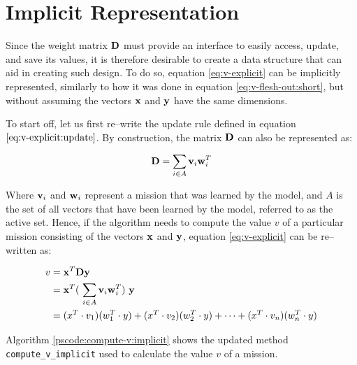\section{Implicit Representation} \label{sect:meth:implicit}

Since the weight matrix $\boldsymbol{\mathbf{D}}$ must provide an interface to easily access, update, and save its values, it is therefore desirable to create a data structure that can aid in creating such design. To do so, equation \ref{eq:v-explicit} can be implicitly represented, similarly to how it was done in equation \ref{eq:v-flesh-out:short}, but without assuming the vectors $\boldsymbol{\mathbf{x}}$ and $\boldsymbol{\mathbf{y}}$ have the same dimensions. \newline

To start off, let us first re--write the update rule defined in equation $\ref{eq:v-explicit:update}$. By construction, the matrix $\boldsymbol{\mathbf{D}}$ can also be represented as:

\begin{equation} \label{eq:d-implicit}
    \boldsymbol{\mathbf{D}} = \sum_{i \in A} \boldsymbol{\mathbf{v}}_i \boldsymbol{\mathbf{w}}_i^T
\end{equation}

Where $\boldsymbol{\mathbf{v}}_i$ and $\boldsymbol{\mathbf{w}}_i$ represent a mission that was learned by the model, and $A$ is the set of all vectors that have been learned by the model, referred to as the active set. Hence, if the algorithm needs to compute the value $v$ of a particular mission consisting of the vectors $\boldsymbol{\mathbf{x}}$ and $\boldsymbol{\mathbf{y}}$, equation \ref{eq:v-explicit} can be re--written as:

\begin{equation} \label{eq:v-implicit}
    \begin{split}
        v &= \vect{x}^T \vect{D} \vect{y} \\
        &= \vect{x}^T (\ \sum_{i \in A} \vect{v}_i \vect{w}_i^T )\ \vect{y} \\
        &= ( x^T \cdot v_1 )  ( w_1^T \cdot y ) + ( x^T \cdot v_2 ) ( w_2^T  \cdot y ) + \cdots + ( x^T \cdot v_n )  ( w_n^T \cdot y ) \\
    \end{split}
\end{equation}

Algorithm \ref{pscode:compute-v:implicit} shows the updated method \texttt{compute\_v\_implicit} used to calculate the value $v$ of a mission.

